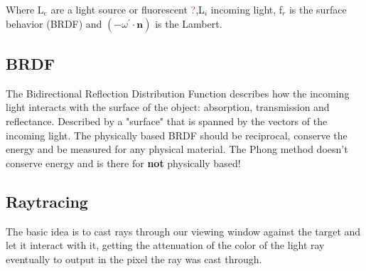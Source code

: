 Where L$_e$ are a light source or fluorescent \textcolor{red}{?},L$_i$ incoming light,  f$_r$ is the surface behavior (BRDF) and $(-\omega^{\prime} \cdot \textbf{n})$ is the Lambert.

\subsection*{BRDF}
The Bidirectional Reflection Distribution Function describes how the incoming light interacts with the surface of the object: absorption, transmission and reflectance. Described by a "surface"
that is spanned by the vectors of the incoming light. The physically based BRDF should be reciprocal, conserve the energy and be measured for any physical material. The Phong method doesn't conserve energy and is there for \textbf{not} physically based!

\subsection*{Raytracing}
The basic idea is to cast rays through our viewing window against the target and let it interact with it, getting the attenuation of the color of the light ray eventually to output in the pixel the ray was cast through. 